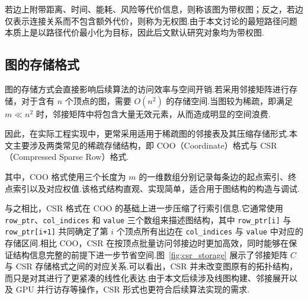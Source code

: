 若边上附带距离、时间、能耗、风险等代价信息，则称该图为带权图；反之，若边仅表示连接关系而不包含额外代价，则称为无权图.由于本文讨论的最短路径问题本质上是以路径代价最小化为目标，因此后文默认研究对象均为带权图.

\subsection{图的存储格式}

图的存储方式会直接影响后续算法的访问效率与空间开销.若采用邻接矩阵进行存储，对于含有 $n$ 个顶点的图，需要 $O(n^2)$ 的存储空间.当图较为稀疏，即满足 $m\ll n^2$ 时，邻接矩阵中将包含大量无效元素，从而造成明显的空间浪费.

因此，在实际工程实现中，更常采用适用于稀疏图的邻接表及其压缩存储形式.本文主要涉及两类常见的稀疏存储结构，即 COO（Coordinate）格式与 CSR（Compressed Sparse Row）格式.

其中，COO 格式使用三个长度为 $m$ 的一维数组分别记录每条边的起点索引、终点索引以及对应权值.该格式结构直观、实现简单，适合用于图结构的构造与调试.

与之相比，CSR 格式在 COO 的基础上进一步压缩了行索引信息.它通常使用 \texttt{row\_ptr}、\texttt{col\_indices} 和 \texttt{value} 三个数组来描述图结构，其中 \texttt{row\_ptr[i]} 与 \texttt{row\_ptr[i+1]} 共同确定了第 $i$ 个顶点所有出边在 \texttt{col\_indices} 与 \texttt{value} 中对应的存储区间.相比 COO，CSR 在按顶点批量访问邻接边时更加高效，同时能够在保证结构信息完整的前提下进一步节省空间.图~\ref{fig:csr_storage} 展示了邻接矩阵 $C$ 与 CSR 存储格式之间的对应关系.可以看出，CSR 并未改变图原有的拓扑结构，而只是对其进行了更紧凑的线性化表达.由于本文后续涉及线图构建、邻接展开以及 GPU 并行访存等操作，CSR 形式也更符合后续算法实现的需求.

